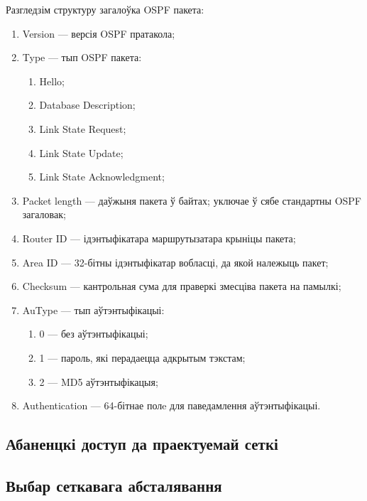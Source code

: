Разгледзім структуру загалоўка OSPF пакета:
\begin{enumerate}
    \item Version --- версія OSPF пратакола;
    \item Type --- тып OSPF пакета:
    \begin{enumerate}
        \item Hello;
        \item Database Description;
        \item Link State Request;
        \item Link State Update;
        \item Link State Acknowledgment;
    \end{enumerate}
    \item Packet length --- даўжыня пакета ў байтах;
          уключае ў сябе стандартны OSPF загаловак;
    \item Router ID --- ідэнтыфікатара маршрутызатара крыніцы пакета;
    \item Area ID --- 32-бітны ідэнтыфікатар вобласці, да якой належыць пакет;
    \item Checksum --- кантрольная сума для праверкі змесціва пакета на памылкі;
    \item AuType --- тып аўтэнтыфікацыі:
    \begin{enumerate}
        \item 0 --- без аўтэнтыфікацыі;
        \item 1 --- пароль, які перадаецца адкрытым тэкстам;
        \item 2 --- MD5 аўтэнтыфікацыя;
    \end{enumerate}
    \item Authentication --- 64-бітнае полe для паведамлення аўтэнтыфікацыі.
\end{enumerate}

\subsection{Абаненцкі доступ да праектуемай сеткі}

\subsection{Выбар сеткавага абсталявання}
